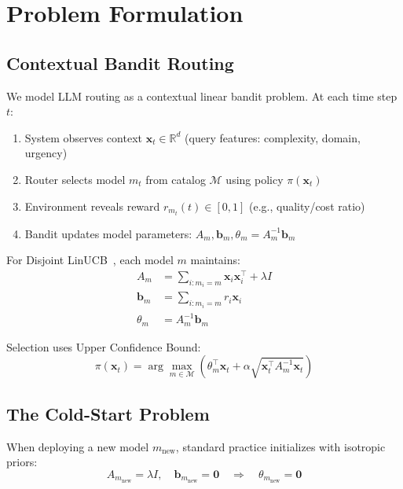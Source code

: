 \documentclass[sigconf,nonacm]{acmart}
\begin{document}
\section{Problem Formulation}

\subsection{Contextual Bandit Routing}

We model LLM routing as a contextual linear bandit problem. At each time step $t$:

\begin{enumerate}
    \item System observes context $\mathbf{x}_t \in \mathbb{R}^d$ (query features: complexity, domain, urgency)
    \item Router selects model $m_t$ from catalog $\mathcal{M}$ using policy $\pi(\mathbf{x}_t)$
    \item Environment reveals reward $r_{m_t}(t) \in [0,1]$ (e.g., quality/cost ratio)
    \item Bandit updates model parameters: $A_m, \mathbf{b}_m, \theta_m = A_m^{-1}\mathbf{b}_m$
\end{enumerate}

For Disjoint LinUCB~\cite{li2010contextual}, each model $m$ maintains:
\begin{align}
A_m &= \sum_{i:m_i=m} \mathbf{x}_i\mathbf{x}_i^\top + \lambda I \\
\mathbf{b}_m &= \sum_{i:m_i=m} r_i \mathbf{x}_i \\
\theta_m &= A_m^{-1}\mathbf{b}_m
\end{align}

Selection uses Upper Confidence Bound:
\begin{equation}
\pi(\mathbf{x}_t) = \arg\max_{m \in \mathcal{M}} \left( \theta_m^\top \mathbf{x}_t + \alpha \sqrt{\mathbf{x}_t^\top A_m^{-1} \mathbf{x}_t} \right)
\end{equation}

\subsection{The Cold-Start Problem}

When deploying a new model $m_{\text{new}}$, standard practice initializes with isotropic priors:
\begin{equation}
A_{m_{\text{new}}} = \lambda I, \quad \mathbf{b}_{m_{\text{new}}} = \mathbf{0} \quad \Rightarrow \quad \theta_{m_{\text{new}}} = \mathbf{0}
\end{equation}
\end{document}
